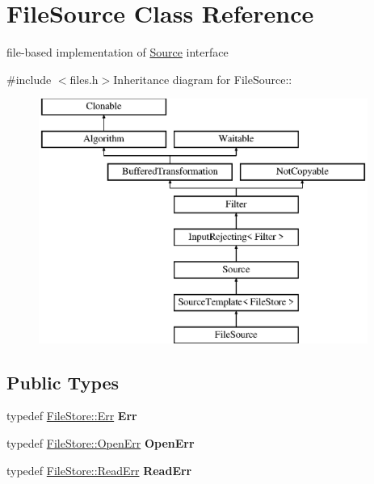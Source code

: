 \hypertarget{class_file_source}{
\section{FileSource Class Reference}
\label{class_file_source}
}


file-\/based implementation of \hyperlink{class_source}{Source} interface  


{\ttfamily \#include $<$files.h$>$}Inheritance diagram for FileSource::\begin{figure}[H]
\begin{center}
\leavevmode
\includegraphics[height=8cm]{class_file_source}
\end{center}
\end{figure}
\subsection*{Public Types}
\begin{DoxyCompactItemize}
\item 
\hypertarget{class_file_source_a4660cff39be4c76c789960dff8e4c8b9}{
typedef \hyperlink{class_file_store_1_1_err}{FileStore::Err} {\bfseries Err}}
\label{class_file_source_a4660cff39be4c76c789960dff8e4c8b9}

\item 
\hypertarget{class_file_source_a20893abd3421c8097546c7470e028857}{
typedef \hyperlink{class_file_store_1_1_open_err}{FileStore::OpenErr} {\bfseries OpenErr}}
\label{class_file_source_a20893abd3421c8097546c7470e028857}

\item 
\hypertarget{class_file_source_aab68ca4a635a953a5e156b8106268a85}{
typedef \hyperlink{class_file_store_1_1_read_err}{FileStore::ReadErr} {\bfseries ReadErr}}
\label{class_file_source_aab68ca4a635a953a5e156b8106268a85}

\end{DoxyCompactItemize}
